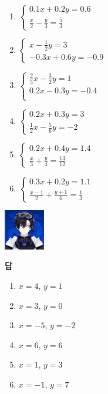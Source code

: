 \documentclass{article}
\begin{document}
\newpage
\section{}

\begin{enumerate}[label=(\arabic*), itemsep=50pt]
    \item
    \(\begin{cases}
        0.1x+0.2y=0.6\\
        \frac x2-\frac y3=\frac53
    \end{cases}\)
    \item
    \(\begin{cases}
        x-\frac12 y=3\\
        -0.3x+0.6y=-0.9
    \end{cases}\)
    \item
    \(\begin{cases}
        \frac 25x-\frac32y=1\\
        0.2x-0.3y=-0.4\\
    \end{cases}\)
    \item
    \(\begin{cases}
        0.2x+0.3y=3\\
        \frac 12x-\frac56y=-2
    \end{cases}\)
    \item
    \(\begin{cases}
        0.2x+0.4y=1.4\\
        \frac x3+\frac y4=\frac{13}{12}
    \end{cases}\)
    \item
    \(\begin{cases}
        0.3x+0.2y=1.1\\
        \frac{x-1}2+\frac{y+1}6=\frac13
    \end{cases}\)
\end{enumerate}

\begin{flushright}
\includegraphics[width=50pt]{jack.png}
\end{flushright}

\vspace*{\fill}
\noindent\textbf{답}
\begin{enumerate}[label=(\arabic*)]
    \item \(x=4\), \(y=1\)
    \item \(x=3\), \(y=0\)
    \item \(x=-5\), \(y=-2\)
    \item \(x=6\), \(y=6\)
    \item \(x=1\), \(y=3\)
    \item \(x=-1\), \(y=7\)
\end{enumerate}
\end{document}
